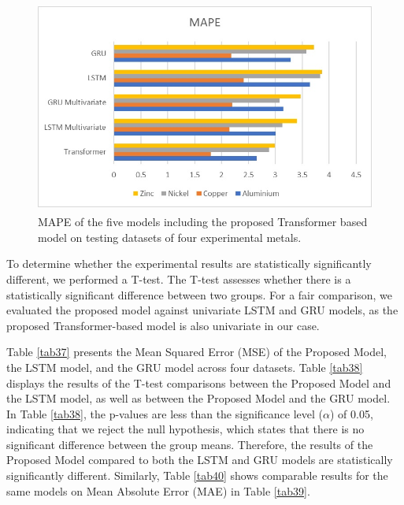 \documentclass[preprint,12pt]{elsarticle}
\begin{document}
\begin{center}
	\begin{figure}[!htbp]
		\centering
		\includegraphics[width=15cm, height=7cm]{MAPE.png}
		\caption{MAPE of the five models including the proposed Transformer based model on testing datasets of four experimental metals.}
		\label{fig13}
	\end{figure}
\end{center}



\par To determine whether the experimental results are statistically significantly different, we performed a T-test. The T-test assesses whether there is a statistically significant difference between two groups. For a fair comparison, we evaluated the proposed model against univariate LSTM and GRU models, as the proposed Transformer-based model is also univariate in our case.

\par Table \ref{tab37} presents the Mean Squared Error (MSE) of the Proposed Model, the LSTM model, and the GRU model across four datasets. Table \ref{tab38} displays the results of the T-test comparisons between the Proposed Model and the LSTM model, as well as between the Proposed Model and the GRU model. In Table \ref{tab38}, the p-values are less than the significance level ($\alpha$) of 0.05, indicating that we reject the null hypothesis, which states that there is no significant difference between the group means. Therefore, the results of the Proposed Model compared to both the LSTM and GRU models are statistically significantly different. Similarly, Table \ref{tab40} shows comparable results for the same models on Mean Absolute Error (MAE) in Table \ref{tab39}.
\end{document}
